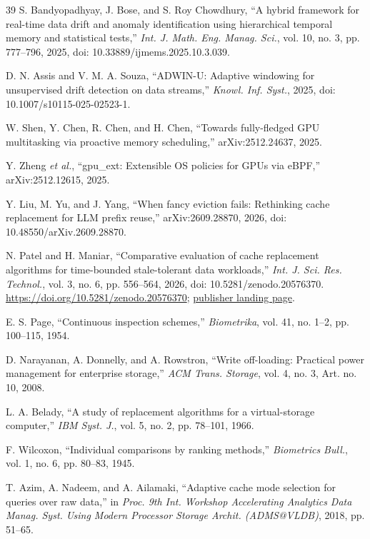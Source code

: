 \documentclass[10pt,twocolumn,a4paper]{IEEEtran}
\begin{document}
\begin{thebibliography}{39}
 S. Bandyopadhyay, J. Bose, and S. Roy Chowdhury, ``A hybrid
framework for real-time data drift and anomaly identification using
hierarchical temporal memory and statistical tests,'' \emph{Int. J. Math. Eng.
Manag. Sci.}, vol. 10, no. 3, pp. 777--796, 2025, doi:
10.33889/ijmems.2025.10.3.039.

 D. N. Assis and V. M. A. Souza, ``ADWIN-U: Adaptive windowing
for unsupervised drift detection on data streams,'' \emph{Knowl. Inf. Syst.},
2025, doi: 10.1007/s10115-025-02523-1.

 W. Shen, Y. Chen, R. Chen, and H. Chen, ``Towards fully-fledged
GPU multitasking via proactive memory scheduling,'' arXiv:2512.24637, 2025.

 Y. Zheng \emph{et al.}, ``gpu\_ext: Extensible OS policies for
GPUs via eBPF,'' arXiv:2512.12615, 2025.

 Y. Liu, M. Yu, and J. Yang, ``When fancy eviction fails:
Rethinking cache replacement for LLM prefix reuse,'' arXiv:2609.28870, 2026,
doi: 10.48550/arXiv.2609.28870.

 N. Patel and H. Maniar, ``Comparative evaluation of cache
replacement algorithms for time-bounded stale-tolerant data workloads,''
\emph{Int. J. Sci. Res. Technol.}, vol. 3, no. 6, pp. 556--564, 2026, doi:
10.5281/zenodo.20576370. \url{https://doi.org/10.5281/zenodo.20576370};
\href{https://ijsrtjournal.com/article/comparative-evaluation-of-cache-replacement-algorithms-for-time-bounded-stale-tolerant-data-workloads}{publisher landing page}.

 E. S. Page, ``Continuous inspection schemes,'' \emph{Biometrika},
vol. 41, no. 1--2, pp. 100--115, 1954.

 D. Narayanan, A. Donnelly, and A. Rowstron, ``Write
off-loading: Practical power management for enterprise storage,'' \emph{ACM
Trans. Storage}, vol. 4, no. 3, Art. no. 10, 2008.

 L. A. Belady, ``A study of replacement algorithms for a
virtual-storage computer,'' \emph{IBM Syst. J.}, vol. 5, no. 2, pp. 78--101,
1966.

 F. Wilcoxon, ``Individual comparisons by ranking methods,''
\emph{Biometrics Bull.}, vol. 1, no. 6, pp. 80--83, 1945.

 T. Azim, A. Nadeem, and A. Ailamaki, ``Adaptive cache mode
selection for queries over raw data,'' in \emph{Proc. 9th Int. Workshop
Accelerating Analytics Data Manag. Syst. Using Modern Processor Storage Archit.
(ADMS@VLDB)}, 2018, pp. 51--65.


\end{thebibliography}
\end{document}
